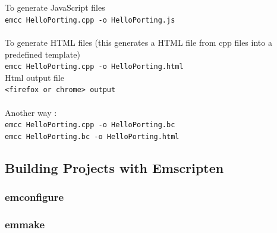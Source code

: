\documentclass[12pt]{article}
\begin{document}
\\
\\
To generate JavaScript files\\
\texttt{emcc  HelloPorting.cpp -o HelloPorting.js}
\\
\\
To generate HTML files (this generates a HTML file from cpp files into a predefined template)\\
\texttt{emcc HelloPorting.cpp -o HelloPorting.html}
\\
Html output file\\
\texttt{<firefox or chrome> output}
\\ \\
Another way :\\
\texttt{emcc HelloPorting.cpp -o HelloPorting.bc}\\
\texttt{emcc HelloPorting.bc -o HelloPorting.html}

\subsection{Building Projects with Emscripten}

\subsubsection{emconfigure}
\subsubsection{emmake}
\end{document}

